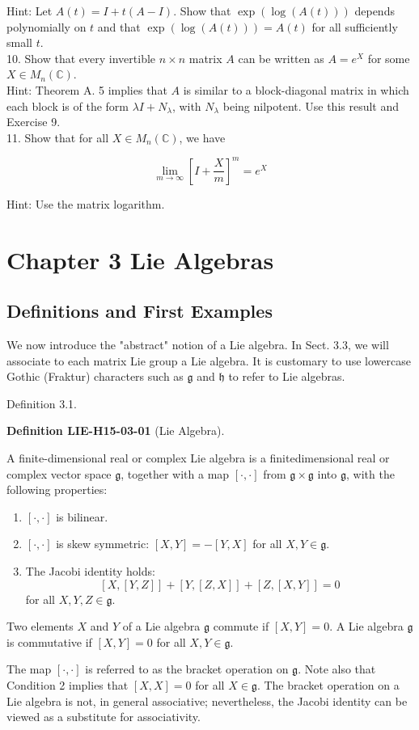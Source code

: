 \documentclass[10pt, letterpaper]{article}
\newcommand{\CustomHeading}[3]{%
  \par\medskip\noindent%
  \textbf{#1 #2} \textnormal{(#3)}.\enskip%
}
\newenvironment{DEF}[2]{\begin{unitbox}\CustomHeading{Definition}{#1}{#2}}{\end{unitbox}}
\begin{document}
Hint: Let $A(t)=I+t(A-I)$. Show that $\exp (\log (A(t)))$ depends polynomially on $t$ and that $\exp (\log (A(t)))=A(t)$ for all sufficiently small $t$.\\
10. Show that every invertible $n \times n$ matrix $A$ can be written as $A=e^{X}$ for some $X \in M_{n}(\mathbb{C})$.\\
Hint: Theorem A. 5 implies that $A$ is similar to a block-diagonal matrix in which each block is of the form $\lambda I+N_{\lambda}$, with $N_{\lambda}$ being nilpotent. Use this result and Exercise 9.\\
11. Show that for all $X \in M_{n}(\mathbb{C})$, we have

$$
\lim _{m \rightarrow \infty}\left[I+\frac{X}{m}\right]^{m}=e^{X}
$$

Hint: Use the matrix logarithm.



\pagebreak



\section*{Chapter 3 Lie Algebras}


\subsection*{Definitions and First Examples}
We now introduce the "abstract" notion of a Lie algebra. In Sect. 3.3, we will associate to each matrix Lie group a Lie algebra. It is customary to use lowercase Gothic (Fraktur) characters such as $\mathfrak{g}$ and $\mathfrak{h}$ to refer to Lie algebras.

Definition 3.1. 

\begin{DEF}{LIE-H15-03-01}{Lie Algebra}
A finite-dimensional real or complex Lie algebra is a finitedimensional real or complex vector space $\mathfrak{g}$, together with a map $[\cdot, \cdot]$ from $\mathfrak{g} \times \mathfrak{g}$ into $\mathfrak{g}$, with the following properties:
\begin{enumerate}
  \item $[\cdot, \cdot]$ is bilinear.
  \item $[\cdot, \cdot]$ is skew symmetric: $[X, Y]=-[Y, X]$ for all $X, Y \in \mathfrak{g}$.
  \item The Jacobi identity holds:
  $$
  [X,[Y, Z]]+[Y,[Z, X]]+[Z,[X, Y]]=0
  $$
  for all $X, Y, Z \in \mathfrak{g}$.
\end{enumerate}
Two elements $X$ and $Y$ of a Lie algebra $\mathfrak{g}$ commute if $[X, Y]=0$. A Lie algebra $\mathfrak{g}$ is commutative if $[X, Y]=0$ for all $X, Y \in \mathfrak{g}$.

The map $[\cdot, \cdot]$ is referred to as the bracket operation on $\mathfrak{g}$. Note also that Condition 2 implies that $[X, X]=0$ for all $X \in \mathfrak{g}$. The bracket operation on a Lie algebra is not, in general associative; nevertheless, the Jacobi identity can be viewed as a substitute for associativity.
\end{DEF}
\end{document}
